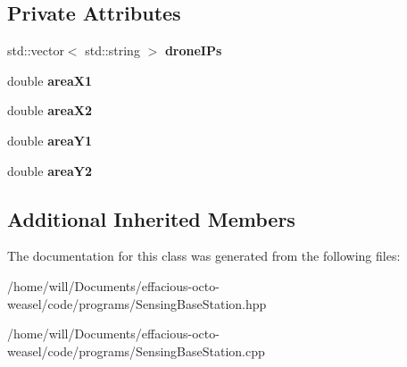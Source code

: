 \subsection*{Private Attributes}
\begin{DoxyCompactItemize}
\item 
std\+::vector$<$ std\+::string $>$ {\bfseries drone\+I\+Ps}\hypertarget{class_sensing_base_station_a93813cd6b5516be06b563c195dc69665}{}\label{class_sensing_base_station_a93813cd6b5516be06b563c195dc69665}

\item 
double {\bfseries area\+X1}\hypertarget{class_sensing_base_station_a7b3efba894533c0549fe6db7d4ad5c4c}{}\label{class_sensing_base_station_a7b3efba894533c0549fe6db7d4ad5c4c}

\item 
double {\bfseries area\+X2}\hypertarget{class_sensing_base_station_a23058f9ebd6d787f049f7f77f881a58e}{}\label{class_sensing_base_station_a23058f9ebd6d787f049f7f77f881a58e}

\item 
double {\bfseries area\+Y1}\hypertarget{class_sensing_base_station_add670fedaced344dbaddd5982f9732f0}{}\label{class_sensing_base_station_add670fedaced344dbaddd5982f9732f0}

\item 
double {\bfseries area\+Y2}\hypertarget{class_sensing_base_station_a9b47c4830262006d65dae305a1d34796}{}\label{class_sensing_base_station_a9b47c4830262006d65dae305a1d34796}

\end{DoxyCompactItemize}
\subsection*{Additional Inherited Members}


The documentation for this class was generated from the following files\+:\begin{DoxyCompactItemize}
\item 
/home/will/\+Documents/effacious-\/octo-\/weasel/code/programs/Sensing\+Base\+Station.\+hpp\item 
/home/will/\+Documents/effacious-\/octo-\/weasel/code/programs/Sensing\+Base\+Station.\+cpp\end{DoxyCompactItemize}
